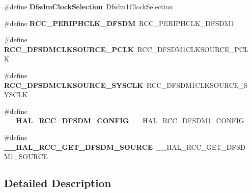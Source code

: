 \begin{DoxyCompactItemize}
\item 
\mbox{\label{group___h_a_l___r_c_c___aliased_ga245665abb7d8072ff233db26331a6648}} 
\#define {\bfseries Dfsdm\+Clock\+Selection}~Dfsdm1\+Clock\+Selection
\item 
\mbox{\label{group___h_a_l___r_c_c___aliased_ga4a97e8e6929bf5ce0a85b8a92fd5c7e6}} 
\#define {\bfseries R\+C\+C\+\_\+\+P\+E\+R\+I\+P\+H\+C\+L\+K\+\_\+\+D\+F\+S\+DM}~R\+C\+C\+\_\+\+P\+E\+R\+I\+P\+H\+C\+L\+K\+\_\+\+D\+F\+S\+D\+M1
\item 
\mbox{\label{group___h_a_l___r_c_c___aliased_ga947a134f814757c5757eef64b84cc949}} 
\#define {\bfseries R\+C\+C\+\_\+\+D\+F\+S\+D\+M\+C\+L\+K\+S\+O\+U\+R\+C\+E\+\_\+\+P\+C\+LK}~R\+C\+C\+\_\+\+D\+F\+S\+D\+M1\+C\+L\+K\+S\+O\+U\+R\+C\+E\+\_\+\+P\+C\+LK
\item 
\mbox{\label{group___h_a_l___r_c_c___aliased_gad529099e8057474b7e1f86deb9519348}} 
\#define {\bfseries R\+C\+C\+\_\+\+D\+F\+S\+D\+M\+C\+L\+K\+S\+O\+U\+R\+C\+E\+\_\+\+S\+Y\+S\+C\+LK}~R\+C\+C\+\_\+\+D\+F\+S\+D\+M1\+C\+L\+K\+S\+O\+U\+R\+C\+E\+\_\+\+S\+Y\+S\+C\+LK
\item 
\mbox{\label{group___h_a_l___r_c_c___aliased_ga7539e94e5f9445ea0cb18f8fae72579e}} 
\#define {\bfseries \+\_\+\+\_\+\+H\+A\+L\+\_\+\+R\+C\+C\+\_\+\+D\+F\+S\+D\+M\+\_\+\+C\+O\+N\+F\+IG}~\+\_\+\+\_\+\+H\+A\+L\+\_\+\+R\+C\+C\+\_\+\+D\+F\+S\+D\+M1\+\_\+\+C\+O\+N\+F\+IG
\item 
\mbox{\label{group___h_a_l___r_c_c___aliased_gad4a161eff1e0026f34cee8c33eff569b}} 
\#define {\bfseries \+\_\+\+\_\+\+H\+A\+L\+\_\+\+R\+C\+C\+\_\+\+G\+E\+T\+\_\+\+D\+F\+S\+D\+M\+\_\+\+S\+O\+U\+R\+CE}~\+\_\+\+\_\+\+H\+A\+L\+\_\+\+R\+C\+C\+\_\+\+G\+E\+T\+\_\+\+D\+F\+S\+D\+M1\+\_\+\+S\+O\+U\+R\+CE
\end{DoxyCompactItemize}


\subsection{Detailed Description}
